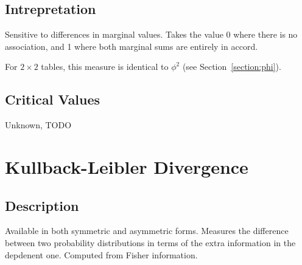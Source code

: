 \documentclass[11pt]{article}
\begin{document}
\subsection{Intrepretation}
Sensitive to differences in marginal values.  Takes the value 0 where there is no association, and 1 where both marginal sums are entirely in accord.

For $2\times 2$ tables, this measure is identical to $\phi^2$ (see Section~\ref{section:phi}).

\subsection{Critical Values}
Unknown, TODO







\section{Kullback-Leibler Divergence}
\subsection{Description}
Available in both symmetric and asymmetric forms.  Measures the difference between two probability distributions in terms of the extra information in the depdenent one.  Computed from Fisher information.  

\end{document}

